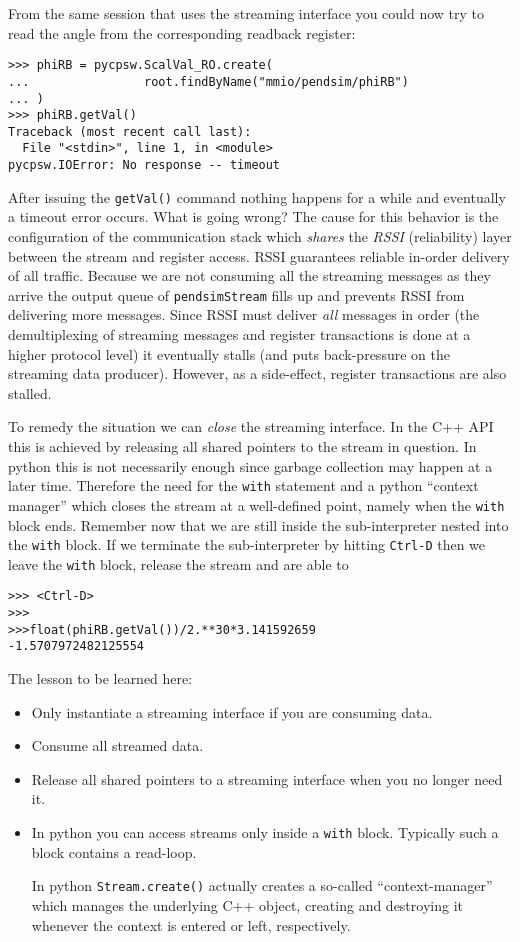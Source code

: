 \documentclass[10pt]{article}
\newcommand{\py}        {python}
\newcommand{\cpp}       {C++}
\newcommand{\cod}[1] {{\tt#1}}
\begin{document}
From the same session that uses the streaming interface you could now try to
read the angle from the corresponding readback register:
\begin{verbatim}
>>> phiRB = pycpsw.ScalVal_RO.create(
...                root.findByName("mmio/pendsim/phiRB")
... )
>>> phiRB.getVal()
Traceback (most recent call last):
  File "<stdin>", line 1, in <module>
pycpsw.IOError: No response -- timeout
\end{verbatim}
After issuing the \cod{getVal()} command nothing happens for a while and eventually
a timeout error occurs. What is going wrong? The cause for this behavior is the
configuration of the communication stack which {\em shares} the {\em RSSI} (reliability) layer
between the stream and register access. RSSI guarantees reliable in-order delivery
of all traffic. Because we are not consuming all the streaming messages as they arrive
the output queue of \cod{pendsimStream} fills up and prevents RSSI from delivering
more messages. Since RSSI must deliver {\em all} messages in order (the demultiplexing
of streaming messages and register transactions is done at a higher protocol level)
it eventually stalls (and puts back-pressure on the streaming data producer).
However, as a side-effect, register transactions are also stalled.

To remedy the situation we can {\em close} the streaming interface. In the \cpp{} API
this is achieved by releasing all shared pointers to the stream in question.
In \py{} this is not necessarily enough since garbage collection 
may happen at a later time. Therefore the need for the \cod{with} statement
and a python ``context manager'' which closes the stream at a well-defined
point, namely when the \cod{with} block ends. Remember now that we are
still inside the sub-interpreter nested into the \cod{with} block. If we terminate
the sub-interpreter by hitting \cod{Ctrl-D} then we leave the \cod{with} block,
release the stream and are able to 
\begin{verbatim}
>>> <Ctrl-D>
>>>
>>>float(phiRB.getVal())/2.**30*3.141592659
-1.5707972482125554
\end{verbatim}

The lesson to be learned here:
\begin{itemize}
\item Only instantiate a streaming interface if you are consuming data.
\item Consume all streamed data.
\item Release all shared pointers to a streaming interface when you no longer
      need it.
\item In \py{} you can access streams only inside a \cod{with} block. Typically
      such a block contains a read-loop.

      In \py{} \cod{Stream.create()} actually creates a so-called ``context-manager''
      which manages the underlying \cpp{} object, creating and destroying it
      whenever the context is entered or left, respectively.
\end{itemize}
\end{document}
